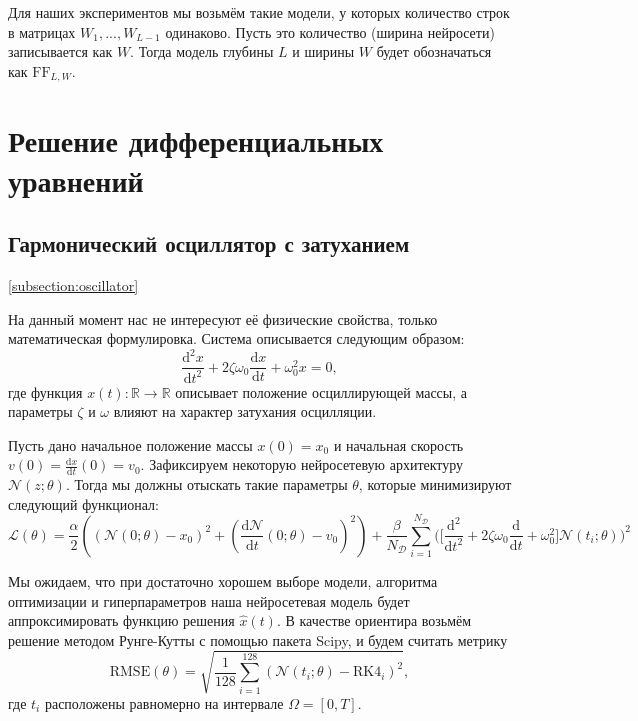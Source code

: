 \documentclass[a4paper, 12pt]{article}
\begin{document}
Для наших экспериментов мы возьмём такие модели, у которых количество строк в матрицах $W_1, ..., W_{L-1}$ одинаково. Пусть это количество (ширина нейросети) записывается как $W$. Тогда модель глубины $L$ и ширины $W$ будет обозначаться как $\mathrm{FF}_{L, W}$.

\section{Решение дифференциальных уравнений} \label{section:diffeqsolving}

\subsection{Гармонический осциллятор с затуханием} \ref{subsection:oscillator}

На данный момент нас не интересуют её физические свойства, только математическая формулировка. Система описывается следующим образом:
\begin{equation} \label{eq:oscillator:diffeq}
    \frac{\mathrm{d}^2 x}{\mathrm{d} t^2} + 2\zeta \omega_0\frac {\mathrm {d} x}{\mathrm {d} t} + \omega _0^2x = 0,
\end{equation}
где функция $x(t) : \mathbb{R} \to \mathbb{R}$ описывает положение осциллирующей массы, а параметры $\zeta$ и $\omega$ влияют на характер затухания осцилляции.

Пусть дано начальное положение массы $x(0) = x_0$ и начальная скорость $v(0) = \frac{\mathrm{d} x}{\mathrm{d} t}(0) = v_0$. Зафиксируем некоторую нейросетевую архитектуру $\mathcal{N}(z; \theta)$. Тогда мы должны отыскать такие параметры $\theta$, которые минимизируют следующий функционал:
\begin{equation*}
    \mathcal{L}(\theta) = \frac{\alpha}{2}((\mathcal{N}(0; \theta) - x_0)^2 + (\frac{\mathrm{d}\mathcal{N}}{\mathrm{d}t}(0; \theta) - v_0)^2) + \frac{\beta}{N_{\mathcal{D}}} \sum_{i = 1}^{N_{\mathcal{D}}} \Big(\Big[\frac{\mathrm{d}^2}{\mathrm{d} t^2} + 2\zeta \omega_0\frac {\mathrm {d}}{\mathrm {d} t} + \omega _0^2\Big]\mathcal{N}(t_i; \theta)\Big)^2
\end{equation*}

Мы ожидаем, что при достаточно хорошем выборе модели, алгоритма оптимизации и гиперпараметров наша нейросетевая модель будет аппроксимировать функцию решения $\hat{x}(t)$. В качестве ориентира возьмём решение методом Рунге-Кутты с помощью пакета Scipy, и будем считать метрику
$$
\mathrm{RMSE}(\theta) = \sqrt{\frac{1}{128}\sum_{i=1}^{128}(\mathcal{N}(t_i;\theta) - \mathrm{RK4}_i)^2},
$$
где $t_i$ расположены равномерно на интервале $\Omega = [0, T]$.
\end{document}
